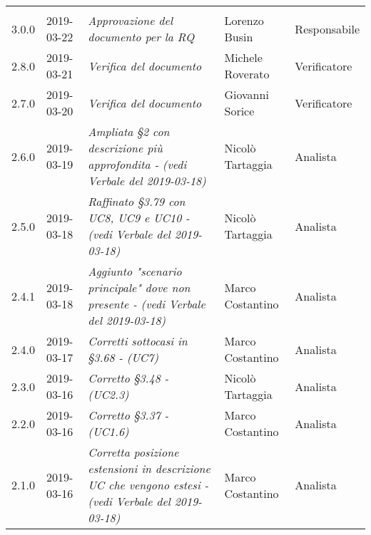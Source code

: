 \newpage 
\section*{}
	\begin{longtable}{C{2cm}|C{2.5cm}|C{4.5cm}|C{2.5cm}|C{3cm}}

	 &  &  &  &   \\
	\endhead
	
		3.0.0 & 2019-03-22 & \emph{Approvazione del documento per la RQ} & Lorenzo Busin & Responsabile \\
		\hline
		
		2.8.0 & 2019-03-21 & \emph{Verifica del documento} & Michele Roverato & Verificatore \\
		\hline
		
		2.7.0 & 2019-03-20 & \emph{Verifica del documento} & Giovanni Sorice & Verificatore \\
		\hline
		
		2.6.0 & 2019-03-19 & \emph{Ampliata §2 con descrizione più approfondita - (vedi Verbale del 2019-03-18)} & Nicolò Tartaggia  & Analista \\
		\hline
	
		2.5.0 & 2019-03-18 & \emph{Raffinato §3.79 con UC8, UC9 e UC10 - (vedi Verbale del 2019-03-18)} & Nicolò Tartaggia  & Analista \\
		\hline
	
		2.4.1 & 2019-03-18 & \emph{Aggiunto "scenario principale" dove non presente - (vedi Verbale del 2019-03-18)} & Marco Costantino & Analista \\
		\hline
	
		2.4.0 & 2019-03-17 & \emph{Corretti sottocasi in §3.68 - (UC7)} & Marco Costantino & Analista \\
		\hline
	
		2.3.0 & 2019-03-16 & \emph{Corretto §3.48 - (UC2.3)} & Nicolò Tartaggia & Analista \\
		\hline
		
		2.2.0 & 2019-03-16 & \emph{Corretto §3.37 - (UC1.6)} & Marco Costantino & Analista \\
		\hline
	
	    2.1.0 & 2019-03-16 & \emph{Corretta posizione estensioni in descrizione UC che vengono estesi  - (vedi Verbale del 2019-03-18)} & Marco Costantino & Analista \\
	    \hline
	

\end{longtable}
